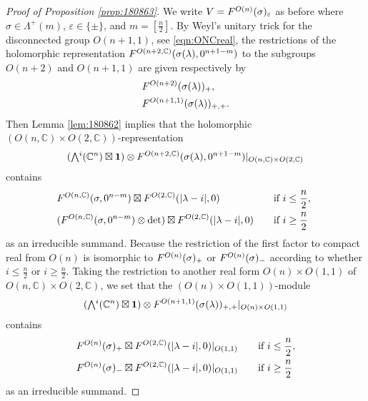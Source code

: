 \begin{proof}
[Proof of Proposition \ref{prop:180863}]
We write $V=F^{{O(n)}}({\sigma})_{\varepsilon}$ as before
 where $\sigma \in \Lambda^+(m)$, 
 $\varepsilon \in \{\pm\}$, 
 and $m=[\frac n 2]$.  
By Weyl's unitary trick for the disconnected group $O(n+1,1)$, 
 see \eqref{eqn:ONCreal}, 
 the restrictions of the holomorphic representation
 $F^{{O(n+2,{\mathbb{C}})}}({\sigma(\lambda), 0^{n+1-m}})$
 to the subgroups $O(n+2)$ and $O(n+1,1)$
 are given respectively by
\begin{align*}
&F^{{O(n+2)}}({\sigma(\lambda)})_{+}, 
\\
&F^{{O(n+1,1)}}({\sigma(\lambda)})_{+,+}.  
\end{align*}
Then Lemma \ref{lem:180862} implies
 that the holomorphic $(O(n,{\mathbb{C}}) \times O(2,{\mathbb{C}}))$-representation
\[
 (\Exterior^i({\mathbb{C}}^n) \boxtimes {\bf{1}})
 \otimes
 \Kirredrep{O(n+2,{\mathbb{C}})}{\sigma(\lambda), 0^{n+1-m}}
 |_{O(n,{\mathbb{C}}) \times O(2,{\mathbb{C}})}
\]
contains
\begin{alignat*}{2}
   &F^{{O(n,{\mathbb{C}})}}({\sigma,0^{n-m}})
   \boxtimes
   F^{{O(2,{\mathbb{C}})}}({|\lambda-i|,0})
\quad
   &&\text{if $i \le \frac n 2$, }
\\
   &(F^{{O(n,{\mathbb{C}})}}({\sigma,0^{n-m}}) \otimes \det)
   \boxtimes
   F^{{O(2,{\mathbb{C}})}}({|\lambda-i|,0})
\quad
   &&\text{if $i \ge \frac n 2$}
\end{alignat*}
as an irreducible summand.  
Because the restriction of the first factor
 to compact real from $O(n)$ is isomorphic
 to $F^{{O(n)}}({\sigma})_+$ or $F^{{O(n)}}({\sigma})_-$
 according to whether $i \le \frac n 2$ or $i \ge \frac n 2$.  
Taking the restriction to another real form 
 $O(n) \times O(1,1)$ of $O(n,{\mathbb{C}}) \times O(2,{\mathbb{C}})$, 
 we set that the $(O(n) \times O(1,1))$-module
\[
   (\Exterior^i({\mathbb{C}}^n) \boxtimes {\bf{1}})
   \otimes
   \Kirredrep {O(n+1,1)}{\sigma(\lambda)}_{+,+}
   |_{O(n) \times O(1,1)}
\]
contains
\begin{alignat*}{2}
   &F^{{O(n)}}({\sigma})_+
   \boxtimes
   F^{{O(2,{\mathbb{C}})}}({|\lambda-i|,0})|_{O(1,1)}
\quad
   &&\text{if $i \le \frac n 2$}, 
\\
   &F^{{O(n)}}({\sigma})_- 
   \boxtimes
   F^{{O(2,{\mathbb{C}})}}({|\lambda-i|,0})|_{O(1,1)}
\quad
   &&\text{if $i \ge \frac n 2$}
\end{alignat*}
as an irreducible summand.  




\end{proof}
